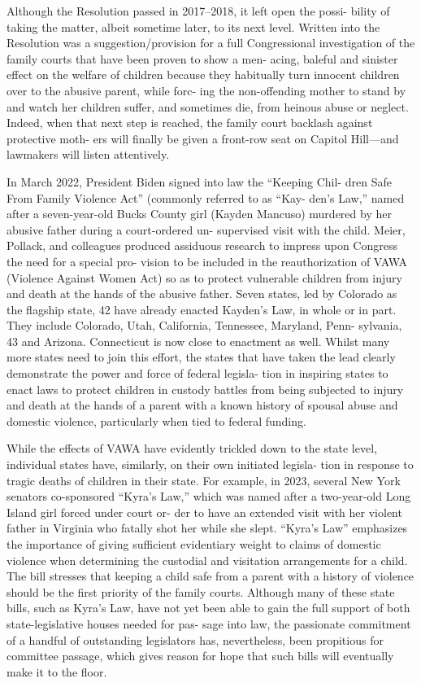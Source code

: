 Although the Resolution passed in 2017–2018, it left open the possi-
bility of taking the matter, albeit sometime later, to its next level. Written
into the Resolution was a suggestion/provision for a full Congressional
investigation of the family courts that have been proven to show a men-
acing, baleful and sinister effect on the welfare of children because they
habitually turn innocent children over to the abusive parent, while forc-
ing the non-offending mother to stand by and watch her children suffer,
and sometimes die, from heinous abuse or neglect. Indeed, when that
next step is reached, the family court backlash against protective moth-
ers will finally be given a front-row seat on Capitol Hill—and lawmakers
will listen attentively. \pfl{}


In March 2022, President Biden signed into law the “Keeping Chil-
dren Safe From Family Violence Act” (commonly referred to as “Kay-
den’s Law,” named after a seven-year-old Bucks County girl (Kayden
Mancuso) murdered by her abusive father during a court-ordered un-
supervised visit with the child. Meier, Pollack, and colleagues produced
assiduous research to impress upon Congress the need for a special pro-
vision to be included in the reauthorization of VAWA (Violence Against
Women Act) so as to protect vulnerable children from injury and death
at the hands of the abusive father. Seven states, led by Colorado as the
flagship state, 42 have already enacted Kayden’s Law, in whole or in part.
They include Colorado, Utah, California, Tennessee, Maryland, Penn-
sylvania, 43 and Arizona. Connecticut is now close to enactment as well.
Whilst many more states need to join this effort, the states that have
taken the lead clearly demonstrate the power and force of federal legisla-
tion in inspiring states to enact laws to protect children in custody battles
from being subjected to injury and death at the hands of a parent with
a known history of spousal abuse and domestic violence, particularly
when tied to federal funding. \pfl{}


While the effects of VAWA have evidently trickled down to the state
level, individual states have, similarly, on their own initiated legisla-
tion in response to tragic deaths of children in their state. For example,
in 2023, several New York senators co-sponsored “Kyra’s Law,” which
was named after a two-year-old Long Island girl forced under court or-
der to have an extended visit with her violent father in Virginia who
fatally shot her while she slept. “Kyra’s Law” emphasizes the importance
of giving sufficient evidentiary weight to claims of domestic violence
when determining the custodial and visitation arrangements for a child.
The bill stresses that keeping a child safe from a parent with a history
of violence should be the first priority of the family courts. Although
many of these state bills, such as Kyra’s Law, have not yet been able to
gain the full support of both state-legislative houses needed for pas-
sage into law, the passionate commitment of a handful of outstanding
legislators has, nevertheless, been propitious for committee passage,
which gives reason for hope that such bills will eventually make it to the
floor. \pfl{}


